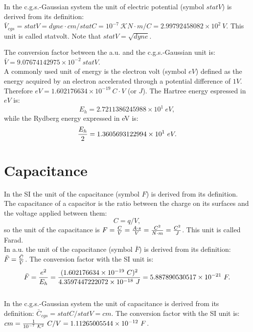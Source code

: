 \documentclass[12pt,a4paper]{article}
\def\e{1.602176634\times 10^{-19}}
\def\baru{4.3597447222072\times 10^{-18}}
\def\barc{1.602176634\times 10^{-19}}
\def\barphi{2.7211386245988\times 10^{1}}
\def\barcap{5.887890530517\times 10^{-21}}
\def\phitophi{2.99792458082\times 10^{2}}
\def\captocap{1.11265005544\times 10^{-12}}
\def\barphicgs{9.07674142975\times 10^{-2}}
\def\ryev{1.3605693122994\times 10^{1}}
\begin{document}
{\color{orange} In the c.g.s.-Gaussian system the unit of electric potential
(symbol $statV$) is derived from its definition: 
$\bar V_{cgs}=statV=dyne\cdot cm / statC = {10^{-7}\ \mathcal{K}} 
N\cdot m/C=\phitophi\ V$. This unit
is called statvolt. Note that 
$statV=\sqrt{dyne}$.
\\
}

{\color{green} 
The conversion factor between the a.u. and the c.g.s.-Gaussian unit
is:
$\bar V = \barphicgs \ statV$.
}
\\

{\color{red} A commonly used unit of energy is the electron volt (symbol $eV$)
defined as the energy acquired by an electron accelerated through a
potential difference of $1 V$. Therefore $eV=\e\ C\cdot V$ (or $J$).
The Hartree energy espressed in $eV$ is: 
\begin{equation}
E_h=\barphi\ eV,
\end{equation}
while the Rydberg energy expressed in eV is:
\begin{equation}
{E_h \over 2}=\ryev\ eV.
\end{equation}
}

\newpage
\section{\color{coral}Capacitance}
In the SI the unit of the capacitance (symbol $F$) is derived from its 
definition. The capacitance of a capacitor is the ratio between the charge
on its surfaces and the voltage applied between them:
\begin{equation}
C=q/V,
\end{equation}
so the unit of the capacitance is $F={C \over V}={A \cdot s \over V}=
{C^2 \over N \cdot m}
={C^2 \over J}$. This unit is called Farad.
\\

{\color{web-blue} In a.u. the unit of the capacitance (symbol $\bar F$) 
is derived from its definition: $\bar F={\bar C \over \bar V}$. The 
conversion factor with the SI unit is:
\begin{equation}
\bar F = {e^2 \over E_h} = {(\barc\ C)^2\over \baru\ J}=\barcap\ F.
\end{equation}
}
\\

{\color{orange} In the c.g.s.-Gaussian system the unit of capacitance
is derived from its definition: $\bar C_{cgs}=statC/statV=cm$. The 
conversion factor with the SI unit is:
$cm={1\over 10^{-7}\ \mathcal{K}^2}\ C/V=\captocap\ F$.
}
\\
\end{document}
